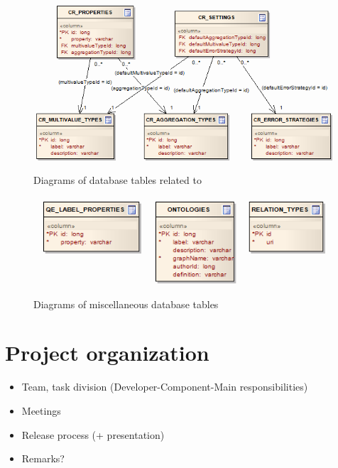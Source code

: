 \begin{figure}[htbp]
    \centering
    \includegraphics[scale=0.6]{images/db-cr.png}
    \caption{Diagrams of database tables related to \CR}
	\label{fig:dbCR}
\end{figure}

\begin{figure}[htbp]
    \centering
    \includegraphics[scale=0.6]{images/db-misc.png}
    \caption{Diagrams of miscellaneous database tables}
	\label{fig:dbMisc}
\end{figure}

\chapter{Project organization}

\begin{itemize}
	\item Team, task division (Developer-Component-Main responsibilities)
	\item Meetings
	\item Release process (+ presentation)
	\item Remarks?
\end{itemize}


